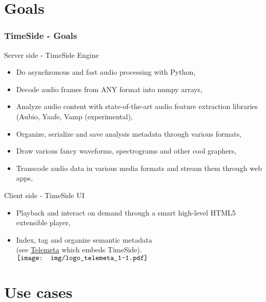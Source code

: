 \documentclass[10pt, final, hyperref, table]{beamer}
\begin{document}
\section{Goals}

\begin{frame}
 \frametitle{TimeSide - Goals}%
\begin{block}{Server side - TimeSide Engine}
  \begin{itemize}
  \item \alert{Do} asynchronous and fast audio processing with Python,
  \item \alert{Decode} audio frames from ANY format into numpy arrays,
  \item \alert{Analyze} audio content with state-of-the-art audio feature extraction libraries (Aubio, Yaafe, Vamp (experimental),
  \item  \alert{Organize}, serialize and save analysis metadata through various formats,
  \item  \alert{Draw} various fancy waveforms, spectrograms and other cool graphers,
  \item  \alert{Transcode} audio data in various media formats and stream them through web apps,
  \end{itemize}
 
\end{block}
\begin{block}{Client side - TimeSide UI}
  \begin{itemize}
  \item   \alert{Playback} and  \alert{interact} on demand through a smart high-level HTML5 extensible player,
  \item   \alert{Index},  \alert{tag} and  \alert{organize semantic metadata} \\
(see \href{http://telemeta.org/}{Telemeta} which embeds TimeSide). 
\hfill $\vcenter{\hbox{\texttt{[image: img/logo\_telemeta\_1-1.pdf]}}}$
  \end{itemize}
\end{block}
\end{frame}


\section{Use cases}
\end{document}
